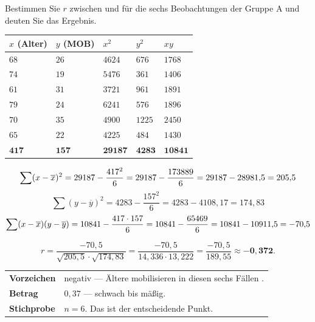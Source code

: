 \begin{aufgabe}
Bestimmen Sie $r$ zwischen  und  für die sechs Beobachtungen der Gruppe A und deuten Sie das Ergebnis.

\loesung
{}
\begin{center}
{\small
\renewcommand{\arraystretch}{1.3}
\begin{tabular}{@{}P{1.2cm}P{1.2cm}P{1.4cm}P{1.4cm}P{1.4cm}@{}}
\toprule
$x$ (Alter) & $y$ (MOB) & $x^2$ & $y^2$ & $xy$\\
\midrule
$68$ & $26$ & $4624$ & $676$ & $1768$\\
$74$ & $19$ & $5476$ & $361$ & $1406$\\
$61$ & $31$ & $3721$ & $961$ & $1891$\\
$79$ & $24$ & $6241$ & $576$ & $1896$\\
$70$ & $35$ & $4900$ & $1225$ & $2450$\\
$65$ & $22$ & $4225$ & $484$ & $1430$\\
\midrule
$\mathbf{417}$ & $\mathbf{157}$ & $\mathbf{29187}$ & $\mathbf{4283}$ & $\mathbf{10841}$\\
\bottomrule
\end{tabular}}
\end{center}

\[ \sum(x-\overline{x})^2 = 29187 - \frac{417^2}{6} = 29187 - \frac{173889}{6} = 29187 - 28981{,}5 = 205{,}5 \]
\[ \sum(y-\overline y)^2 = 4283 - \frac{157^2}{6} = 4283 - 4108{,}17 = 174{,}83 \]
\[ \sum(x-\overline{x})(y-\overline y) = 10841 - \frac{417 \cdot 157}{6} = 10841 - \frac{65469}{6} = 10841 - 10911{,}5 = -70{,}5 \]

\[ r = \frac{-70{,}5}{\sqrt{205{,}5}\cdot\sqrt{174{,}83}} = \frac{-70{,}5}{14{,}336 \cdot 13{,}222} = \frac{-70{,}5}{189{,}55} \approx \mathbf{-0{,}372} . \]

\begin{center}
\renewcommand{\arraystretch}{1.5}
\begin{tabular}{@{}P{2.4cm}P{6.2cm}@{}}
\toprule
\textbf{Vorzeichen} & negativ --- Ältere mobilisieren in diesen sechs Fällen .\\
\textbf{Betrag} & $0{,}37$ --- schwach bis mäßig.\\
\textbf{Stichprobe} & $n = 6$. Das ist der entscheidende Punkt.\\
\bottomrule
\end{tabular}
\end{center}


\end{aufgabe}
